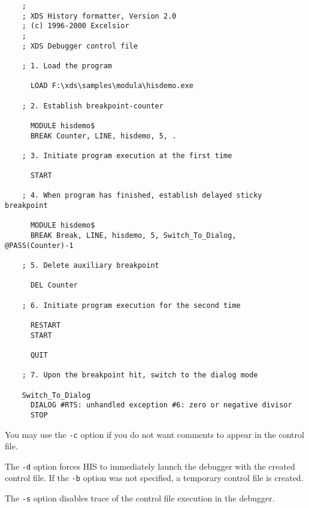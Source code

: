 {\footnotesize
\begin{verbatim}
    ; 
    ; XDS History formatter, Version 2.0
    ; (c) 1996-2000 Excelsior
    ; 
    ; XDS Debugger control file
    
    ; 1. Load the program
    
      LOAD F:\xds\samples\modula\hisdemo.exe  
    
    ; 2. Establish breakpoint-counter
    
      MODULE hisdemo$
      BREAK Counter, LINE, hisdemo, 5, .
    
    ; 3. Initiate program execution at the first time
    
      START
    
    ; 4. When program has finished, establish delayed sticky breakpoint
    
      MODULE hisdemo$
      BREAK Break, LINE, hisdemo, 5, Switch_To_Dialog, @PASS(Counter)-1
    
    ; 5. Delete auxiliary breakpoint
    
      DEL Counter
    
    ; 6. Initiate program execution for the second time
    
      RESTART
      START
    
      QUIT
    
    ; 7. Upon the breakpoint hit, switch to the dialog mode
    
    Switch_To_Dialog
      DIALOG #RTS: unhandled exception #6: zero or negative divisor
      STOP
\end{verbatim}
} %

You may use the \verb'-c' option if you do not want comments to appear in the 
control file.

The \verb'-d' option forces HIS to immediately launch the debugger with the created
control file. If the \verb'-b' option was not specified, a temporary control file 
is created.

The \verb'-s' option disables trace of the control file execution in the debugger.


